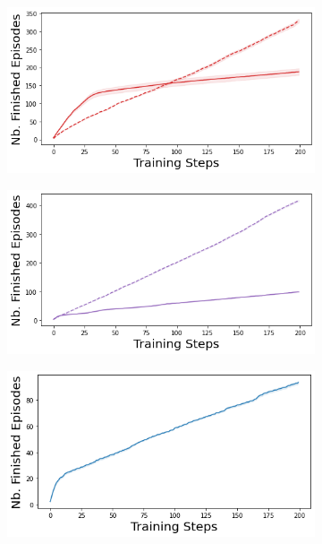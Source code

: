 \begin{figure}
    \begin{subfigure}{.24\textwidth}
        \includegraphics[width=\textwidth]{sections/011_icml2022/resources/cartpole-n_finished_training_episodes-dropout-training-strategy.png}
    \end{subfigure}
    \begin{subfigure}{.24\textwidth}
        \includegraphics[width=\textwidth]{sections/011_icml2022/resources/cartpole-n_finished_training_episodes-ensemble-training-strategy.png}
    \end{subfigure}
    \begin{subfigure}{.24\textwidth}
        \includegraphics[width=\textwidth]{sections/011_icml2022/resources/cartpole-n_finished_training_episodes-dkl-training-strategy.png}

\end{subfigure}
\end{figure}
